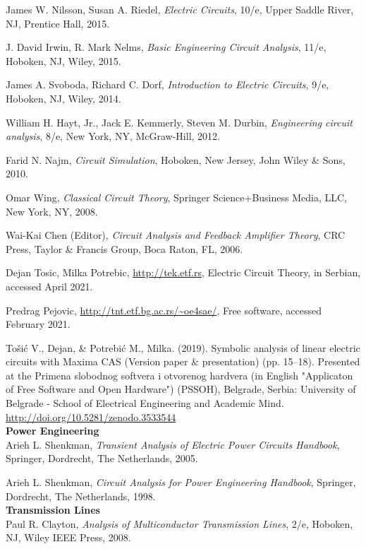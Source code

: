 \documentclass[11pt]{article}
\begin{document}
\begin{thebibliography}{9}
 James W. Nilsson, Susan A. Riedel, \textit{Electric Circuits}, 10/e, Upper Saddle
River, NJ, Prentice Hall, 2015.

J. David Irwin, R. Mark Nelms, \textit{Basic Engineering Circuit Analysis}, 11/e,
Hoboken, NJ, Wiley, 2015.

 James A. Svoboda, Richard C. Dorf, \textit{Introduction to Electric Circuits},
9/e, Hoboken, NJ, Wiley, 2014.

 William H. Hayt, Jr., Jack E. Kemmerly, Steven M. Durbin, \textit{Engineering
circuit analysis}, 8/e, New York, NY, McGraw-Hill, 2012.

 Farid N. Najm, \textit{Circuit Simulation}, Hoboken, New Jersey, John Wiley \&
Sons, 2010.

 Omar Wing, \textit{Classical Circuit Theory}, Springer Science+Business Media,
LLC, New York, NY, 2008.

 Wai-Kai Chen (Editor), \textit{Circuit Analysis and Feedback Amplifier Theory},
CRC Press, Taylor \& Francis Group, Boca Raton, FL, 2006.\\

\fancyfoot[CE,CO]{\leftmark} 

\newpage

 Dejan Tosic, Milka Potrebic,
\url{http://tek.etf.rs}, Electric Circuit Theory, in
Serbian, accessed April 2021.

 Predrag Pejovic, \url{http://tnt.etf.bg.ac.rs/~oe4sae/}, Free software, accessed February 2021.

 Tošić V., Dejan, & Potrebić M., Milka. (2019). Symbolic analysis of linear electric circuits with Maxima CAS (Version paper & presentation) (pp. 15–18). Presented at the Primena slobodnog softvera i otvorenog hardvera (in English "Applicaton of Free Software and Open Hardware") (PSSOH), Belgrade, Serbia: University of Belgrade - School of Electrical Engineering and Academic Mind. \url{http://doi.org/10.5281/zenodo.3533544}\\


\textbf{\large Power Engineering}\\


 Arieh L. Shenkman, \textit{Transient Analysis of Electric Power Circuits Handbook}, Springer, Dordrecht, The Netherlands, 2005.

 Arieh L. Shenkman, \textit{Circuit Analysis for Power Engineering Handbook},
Springer, Dordrecht, The Netherlands, 1998.\\

\textbf{\large Transmission Lines}\\

 Paul R. Clayton, \textit{Analysis of Multiconductor Transmission Lines}, 2/e,
Hoboken, NJ, Wiley IEEE Press, 2008.

\end{thebibliography}
    
    
\end{document}
